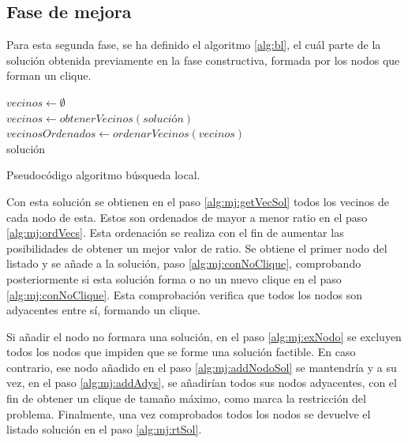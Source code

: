 \subsection{Fase de mejora}
\label{sec:faseBusqueda}
Para esta segunda fase, se ha definido el algoritmo \ref{alg:bl}, el cuál parte de la solución obtenida previamente en la fase constructiva, formada por los nodos que forman un clique.

\begin{algorithm}
	$ vecinos \gets \emptyset $ \\[0.2cm] \label{alg:mj:vecVacios}
	$ vecinos \gets obtenerVecinos(solución)$ \\[0.2cm] \label{alg:mj:getVecSol}
	$ vecinosOrdenados \gets ordenarVecinos(vecinos)$ \\[0.2cm] \label{alg:mj:ordVecs}
	\Return solución \label{alg:mj:rtSol}
	\caption{Pseudocódigo algoritmo búsqueda local.}
	\label{alg:bl}
\end{algorithm}

Con esta solución se obtienen en el paso \ref{alg:mj:getVecSol} todos los vecinos de cada nodo de esta. Estos son ordenados de mayor a menor ratio en el paso \ref{alg:mj:ordVecs}. Esta ordenación se realiza con el fin de aumentar las posibilidades de obtener un mejor valor de ratio. Se obtiene el primer nodo del listado y se añade a la solución, paso \ref{alg:mj:conNoClique}, comprobando posteriormente si esta solución forma o no un nuevo clique en el paso \ref{alg:mj:conNoClique}. Esta comprobación verifica que todos los nodos son adyacentes entre sí, formando un clique.

Si añadir el nodo no formara una solución, en el paso \ref{alg:mj:exNodo} se excluyen todos los nodos que impiden que se forme una solución factible.
En caso contrario, ese nodo añadido en el paso \ref{alg:mj:addNodoSol} se mantendría y a su vez, en el paso \ref{alg:mj:addAdys}, se añadirían todos sus nodos adyacentes, con el fin de obtener un clique de tamaño máximo, como marca la restricción del problema.
Finalmente, una vez comprobados todos los nodos se devuelve el listado solución en el paso \ref{alg:mj:rtSol}.


